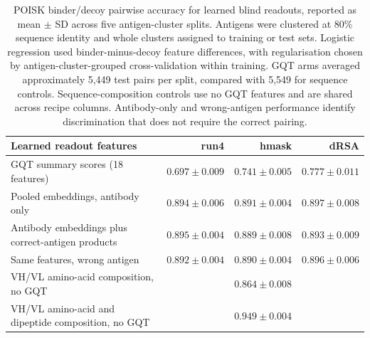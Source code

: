 \begin{table}[htbp]
    \centering
    \small
    \begin{tabularx}{\textwidth}{Xrrr}
        \toprule
        Learned readout features & run4 & hmask & dRSA \\
        \midrule
        GQT summary scores (18 features) & $0.697 \pm 0.009$ & $0.741 \pm 0.005$ & $0.777 \pm 0.011$ \\
        Pooled embeddings, antibody only & $0.894 \pm 0.006$ & $0.891 \pm 0.004$ & $0.897 \pm 0.008$ \\
        Antibody embeddings plus correct-antigen products & $0.895 \pm 0.004$ & $0.889 \pm 0.008$ & $0.893 \pm 0.009$ \\
        Same features, wrong antigen & $0.892 \pm 0.004$ & $0.890 \pm 0.004$ & $0.896 \pm 0.006$ \\
        \midrule
        VH/VL amino-acid composition, no GQT & \multicolumn{3}{c}{$0.864 \pm 0.008$} \\
        VH/VL amino-acid and dipeptide composition, no GQT & \multicolumn{3}{c}{$0.949 \pm 0.004$} \\
        \bottomrule
    \end{tabularx}
    \caption[POISK antibody-only and sequence-composition controls]{POISK binder/decoy pairwise accuracy for learned blind readouts, reported as mean $\pm$ SD across five antigen-cluster splits. Antigens were clustered at 80\% sequence identity and whole clusters assigned to training or test sets. Logistic regression used binder-minus-decoy feature differences, with regularisation chosen by antigen-cluster-grouped cross-validation within training. GQT arms averaged approximately 5,449 test pairs per split, compared with 5,549 for sequence controls. Sequence-composition controls use no GQT features and are shared across recipe columns. Antibody-only and wrong-antigen performance identify discrimination that does not require the correct pairing.}
    \label{tab:jaxka-poisk-learned-controls}
\end{table}

